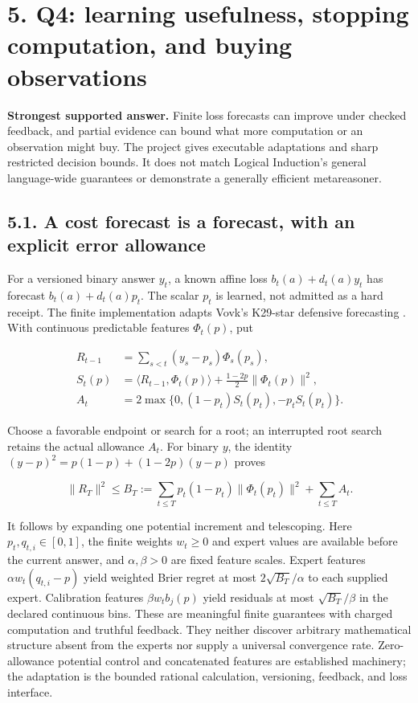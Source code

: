 \documentclass{article}
\theoremstyle{definition}
\begin{document}
\section{5. Q4: learning usefulness, stopping computation, and buying
observations}\label{sec-q4}

\textbf{Strongest supported answer.} Finite loss forecasts can improve
under checked feedback, and partial evidence can bound what more
computation or an observation might buy. The project gives executable
adaptations and sharp restricted decision bounds. It does not match
Logical Induction's general language-wide guarantees or demonstrate a
generally efficient metareasoner.

\subsection{5.1. A cost forecast is a forecast, with an explicit error
allowance}\label{sec-forecast}

For a versioned binary answer \(y_t\), a known affine loss
\(b_t(a)+d_t(a)y_t\) has forecast \(b_t(a)+d_t(a)p_t\). The scalar
\(p_t\) is learned, not admitted as a hard receipt. The finite
implementation adapts Vovk's K29-star defensive forecasting
\citep{vovk}. With continuous predictable features \(\Phi_t(p)\), put

\begin{equation}
\begin{aligned}
 R_{t-1}&=\sum_{s<t}(y_s-p_s)\Phi_s(p_s),\\
 S_t(p)&=\langle R_{t-1},\Phi_t(p)\rangle
             +\tfrac{1-2p}{2}\|\Phi_t(p)\|^2,\\
 A_t&=2\max\{0,(1-p_t)S_t(p_t),-p_tS_t(p_t)\}.
 \end{aligned}
 \label{eq-forecast}
\end{equation}

Choose a favorable endpoint or search for a root; an interrupted root
search retains the actual allowance \(A_t\). For binary \(y\), the
identity \((y-p)^2=p(1-p)+(1-2p)(y-p)\) proves

\begin{equation}
\|R_T\|^2\leq
 B_T:=\sum_{t\leq T}p_t(1-p_t)\|\Phi_t(p_t)\|^2+\sum_{t\leq T}A_t.
 \label{eq-potential}
\end{equation}

It follows by expanding one potential increment and telescoping. Here
\(p_t,q_{t,i}\in[0,1]\), the finite weights \(w_t\geq0\) and expert
values are available before the current answer, and \(\alpha,\beta>0\)
are fixed feature scales. Expert features \(\alpha w_t(q_{t,i}-p)\)
yield weighted Brier regret at most \(2\sqrt{B_T}/\alpha\) to each
supplied expert. Calibration features \(\beta w_tb_j(p)\) yield
residuals at most \(\sqrt{B_T}/\beta\) in the declared continuous bins.
These are meaningful finite guarantees with charged computation and
truthful feedback. They neither discover arbitrary mathematical
structure absent from the experts nor supply a universal convergence
rate. Zero-allowance potential control and concatenated features are
established machinery; the adaptation is the bounded rational
calculation, versioning, feedback, and loss interface.
\end{document}
